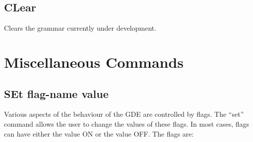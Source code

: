 \subsection{CLear}

Clears the grammar currently under development.

\section{Miscellaneous Commands}

\subsection{SEt flag-name value}

Various aspects of the behaviour of the GDE are controlled by flags. The
``set'' command allows the user to change the values of these flags. In
most cases, flags can have either the value ON or the value OFF. The
flags are:

\newcommand{\gdeflag}[2]{\item #1\\
#2}

